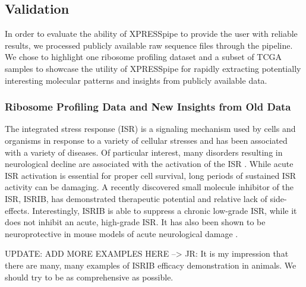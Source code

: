 \documentclass[11pt, a4paper, oneside]{article}
\begin{document}
\subsection{Validation}
In order to evaluate the ability of XPRESSpipe to provide the user with reliable results, we processed publicly available raw sequence files through the pipeline. We chose to highlight one ribosome profiling dataset and a subset of TCGA samples to showcase the utility of XPRESSpipe for rapidly extracting potentially interesting molecular patterns and insights from publicly available data.

\subsubsection{Ribosome Profiling Data and New Insights from Old Data}
The integrated stress response (ISR) is a signaling mechanism used by cells and organisms in response to a variety of cellular stresses and has been associated with a variety of diseases. Of particular interest, many disorders resulting in neurological decline are associated with the activation of the ISR \cite{isr_disease}. While acute ISR activation is essential for proper cell survival, long periods of sustained ISR activity can be damaging. A recently discovered small molecule inhibitor of the ISR, ISRIB, has demonstrated therapeutic potential and relative lack of side-effects. Interestingly, ISRIB is able to suppress a chronic low-grade ISR, while it does not inhibit an acute, high-grade ISR. It has also been shown to be neuroprotective in mouse models of acute neurological damage \cite{isrib_activation, isrib_structure, isrib_riboseq, isrib_neuroprotective}. \par UPDATE: ADD MORE EXAMPLES HERE --> JR: It is my impression that there are many, many examples of ISRIB efficacy demonstration in animals.  We should try to be as comprehensive as possible.
\end{document}
